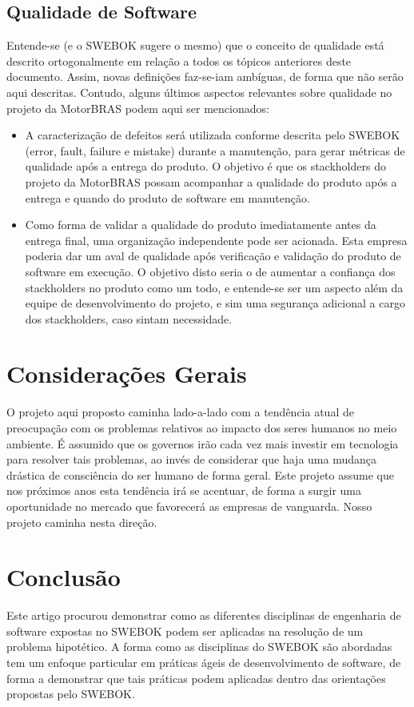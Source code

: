 \documentclass[12pt,journal,compsoc]{IEEEtran}
\begin{document}
\subsection{Qualidade de Software}

Entende-se (e o SWEBOK \cite{society_software_2004} sugere o mesmo) que o conceito de qualidade está descrito ortogonalmente em relação a todos os tópicos anteriores deste documento. Assim, novas de‌finições faz-se-iam ambíguas, de forma que não serão aqui descritas. Contudo, alguns últimos aspectos relevantes sobre qualidade no projeto da MotorBRAS podem aqui ser mencionados:

\begin{itemize}
\item A caracterização de defeitos será utilizada conforme descrita pelo SWEBOK \cite{society_software_2004} (error, fault, failure e mistake) durante a manutenção, para gerar métricas de qualidade após a entrega do produto. O objetivo é que os stackholders do projeto da MotorBRAS possam acompanhar a qualidade do produto após a entrega e quando do produto de software em manutenção.
\item Como forma de validar a qualidade do produto imediatamente antes da entrega final, uma organização independente pode ser acionada. Esta empresa poderia dar um aval de qualidade após verificação e validação do produto de software em execução. O objetivo disto seria o de aumentar a confiança dos stackholders no produto como um todo, e entende-se ser um aspecto além da equipe de desenvolvimento do projeto, e sim uma segurança adicional a cargo dos stackholders, caso sintam necessidade. 
\end{itemize}


\section{Considerações Gerais}

O projeto aqui proposto caminha lado-a-lado com a tendência atual de preocupação com os problemas relativos ao impacto dos seres humanos no meio ambiente. É assumido que os governos irão cada vez mais investir em tecnologia para resolver tais problemas, ao invés de considerar que haja uma mudança drástica de consciência do ser humano de forma geral. Este projeto assume que nos próximos anos esta tendência irá se acentuar, de forma a surgir uma oportunidade no mercado que favorecerá as empresas de vanguarda. Nosso projeto caminha nesta direção. 


\section{Conclusão}

Este artigo procurou demonstrar como as diferentes disciplinas de engenharia de software expostas no SWEBOK podem ser aplicadas na resolução de um problema hipotético. A forma como as disciplinas do SWEBOK são abordadas tem um enfoque particular em práticas ágeis de desenvolvimento de software, de forma a demonstrar que tais práticas podem aplicadas dentro das orientações propostas pelo SWEBOK.



\end{document}
